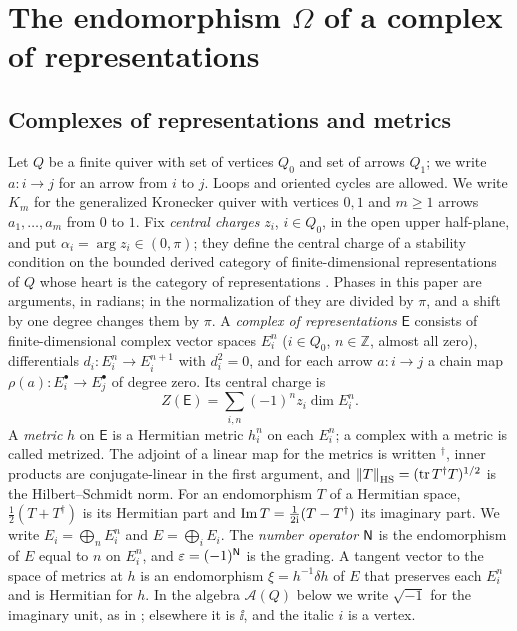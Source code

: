 \section{The endomorphism \texorpdfstring{$\Omega$}{Omega} of a complex of representations}\label{sec:setting}

\subsection{Complexes of representations and metrics}
Let $Q$ be a finite quiver with set of vertices $Q_0$ and set of arrows
$Q_1$; we write $a:i\to j$ for an arrow from $i$ to $j$. Loops and oriented
cycles are allowed. We write $K_m$ for the generalized Kronecker quiver with
vertices $0,1$ and $m\geq1$ arrows $a_1,\dots,a_m$ from $0$ to $1$. Fix
\emph{central charges} $z_i$, $i\in Q_0$, in the open upper half-plane, and
put $\alpha_i=\arg z_i\in(0,\pi)$; they define the central charge of a stability
condition on the bounded derived category of finite-dimensional
representations of $Q$ whose heart is the category of representations
\cite[Propositions~2.4 and~5.3]{bri07}. Phases in this paper are arguments, in radians; in the
normalization of \cite{bri07} they are divided by $\pi$, and a shift by one
degree changes them by $\pi$. A \emph{complex of representations}
$\mathsf E$ consists of finite-dimensional complex vector spaces $E_i^n$
($i\in Q_0$, $n\in\mathbb Z$, almost all zero), differentials
$d_i:E_i^n\to E_i^{n+1}$ with $d_i^2=0$, and for each arrow $a:i\to j$ a chain
map $\rho(a):E_i^\bullet\to E_j^\bullet$ of degree zero. Its central charge is
\[
 Z(\mathsf E)=\sum_{i,n}(-1)^nz_i\dim E_i^n .
\]
A \emph{metric} $h$ on $\mathsf E$ is a Hermitian metric $h_i^n$ on each
$E_i^n$; a complex with a metric is called metrized. The adjoint of a linear
map for the metrics is written ${}^\dagger$, inner products are
conjugate-linear in the first argument, and
$\left\lVert T\right\rVert_{\mathrm{HS}}=(\operatorname{tr} T^\dagger T)^{1/2}$ is the Hilbert--Schmidt norm. For an
endomorphism $T$ of a Hermitian space, $\frac12(T+T^\dagger)$ is its
Hermitian part and $\operatorname{Im} T=\frac1{2\mathrm i}(T-T^\dagger)$ its imaginary part. We
write $E_i=\bigoplus_nE_i^n$
and $E=\bigoplus_iE_i$. The \emph{number operator} $\mathsf N$ is the endomorphism
of $E$ equal to $n$ on $E_i^n$, and $\varepsilon=(-1)^{\mathsf N}$ is the grading. A
tangent vector to the space of metrics at $h$ is an endomorphism
$\xi=h^{-1}\delta h$ of $E$ that preserves each $E_i^n$ and is Hermitian for
$h$. In the algebra $\mathcal A(Q)$ below we write $\sqrt{-1}$ for the
imaginary unit, as in \cite{hkkp26}; elsewhere it is $\ii$, and the italic
$i$ is a vertex.


